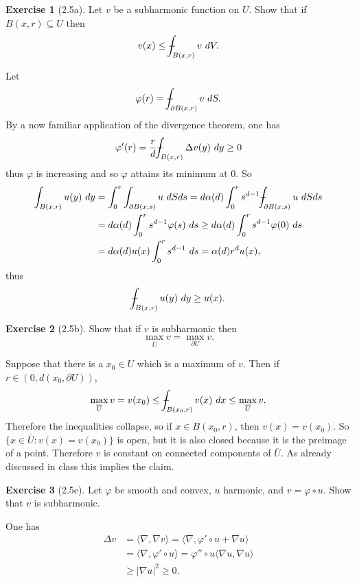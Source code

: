 \documentclass[10pt]{article}
\def\Xint#1{\mathchoice
{\XXint\displaystyle\textstyle{#1}}%
{\XXint\textstyle\scriptstyle{#1}}%
{\XXint\scriptstyle\scriptscriptstyle{#1}}%
{\XXint\scriptscriptstyle\scriptscriptstyle{#1}}%
\!\int}
\def\XXint#1#2#3{{\setbox0=\hbox{$#1{#2#3}{\int}$ }
\vcenter{\hbox{$#2#3$ }}\kern-.6\wd0}}
\def\dashint{\Xint-}
\theoremstyle{definition}
\newtheorem{exer}{Exercise}
\begin{document}
\begin{exer}[2.5a]
Let $v$ be a subharmonic function on $U$. Show that if $B(x, r) \subseteq U$ then
$$v(x) \leq \dashint_{B(x, r)} v~dV.$$
\end{exer}

Let
$$\varphi(r) = \dashint_{\partial B(x, r)} v~dS.$$
By a now familiar application of the divergence theorem, one has
$$\varphi'(r) = \frac{r}{d} \dashint_{B(x, r)} \Delta v(y)~dy \geq 0$$
thus $\varphi$ is increasing and so $\varphi$ attains its minimum at $0$. So
\begin{align*}
\int_{B(x, r)} u(y)~dy &= \int_0^r \int_{\partial B(x, s)} u~dSds = d\alpha(d) \int_0^r s^{d-1} \dashint_{\partial B(x, s)} u~dSds \\
&= d\alpha(d) \int_0^r s^{d-1} \varphi(s) ~ds \geq d\alpha(d) \int_0^r s^{d-1} \varphi(0) ~ds\\
&= d\alpha(d)u(x) \int_0^r s^{d-1} ~ds = \alpha(d)r^du(x),
\end{align*}
thus
$$\dashint_{B(x, r)} u(y)~dy \geq u(x).$$

\begin{exer}[2.5b]
Show that if $v$ is subharmonic then
$$\max_{\overline U} v = \max_{\partial U} v.$$
\end{exer}

Suppose that there is a $x_0 \in U$ which is a maximum of $v$. Then if $r \in (0, d(x_0, \partial U))$,
$$\max_{\overline U} v = v(x_0) \leq \dashint_{B(x_0, r)} v(x)~dx \leq \max_{\overline U} v.$$
Therefore the inequalities collapse, so if $x \in B(x_0, r)$, then $v(x) = v(x_0)$.
So $\{x \in \overline U: v(x) = v(x_0)\}$ is open, but it is also closed because it is the preimage of a point.
Therefore $v$ is constant on connected components of $\overline U$. As already discussed in class this implies the claim.

\begin{exer}[2.5c]
Let $\varphi$ be smooth and convex, $u$ harmonic, and $v = \varphi \circ u$. Show that $v$ is subharmonic.
\end{exer}

One has
\begin{align*}
\Delta v &= \langle \nabla, \nabla v\rangle = \langle \nabla, \varphi' \circ u + \nabla u\rangle \\
&= \langle \nabla, \varphi' \circ u\rangle
= \varphi'' \circ u \langle \nabla u, \nabla u\rangle\\
&\geq |\nabla u|^2 \geq 0.
\end{align*}
\end{document}

